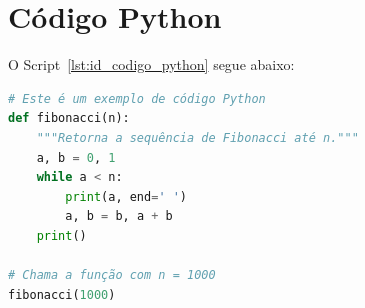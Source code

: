 \section{Código Python}

O Script~\ref{lst:id_codigo_python} segue abaixo:

\begin{lstlisting}[language=Python, caption={Exemplo de Código Python}, frame=single, label={lst:id_codigo_python}]
# Este é um exemplo de código Python
def fibonacci(n):
    """Retorna a sequência de Fibonacci até n."""
    a, b = 0, 1
    while a < n:
        print(a, end=' ')
        a, b = b, a + b
    print()

# Chama a função com n = 1000
fibonacci(1000)
\end{lstlisting}

